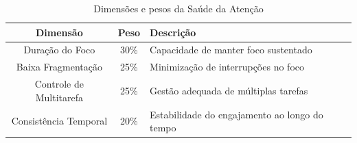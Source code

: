 \begin{table}[H]
    \centering
    \vspace{0.5cm}
    \begin{tabular}{|c|c|l|}
        \hline
        Dimensão & Peso & Descrição \\
        \hline
        Duração do Foco & 30\% & Capacidade de manter foco sustentado \\
        Baixa Fragmentação & 25\% & Minimização de interrupções no foco \\
        Controle de Multitarefa & 25\% & Gestão adequada de múltiplas tarefas\\
        Consistência Temporal & 20\% & Estabilidade do engajamento ao longo do tempo\\
        \hline
    \end{tabular}
    \caption{Dimensões e pesos da Saúde da Atenção}
    \label{tab:attention_health_components}
\end{table}